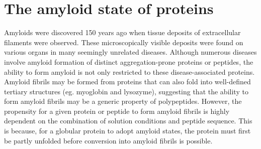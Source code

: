 


\section{The amyloid state of proteins}
\label{sec:amyloid}

Amyloids were discovered 150 years ago when tissue deposits of extracellular filaments were observed.\cite{Haass:2007db,Sipe:2000fs} These microscopically visible deposits were found on various organs in many seemingly unrelated diseases. 
Although numerous diseases involve amyloid formation of distinct aggregation-prone proteins or peptides, the ability to form amyloid is not only restricted to these disease-associated proteins. Amyloid fibrils may be formed from proteins that can also fold into well-defined tertiary structures (eg. myoglobin and lysozyme), suggesting that the ability to form amyloid fibrils may be a generic property of polypeptides.\cite{Chiti:2006fz} However, the propensity for a given protein or peptide to form amyloid fibrils is highly dependent on the combination of solution conditions and peptide sequence. This is because, for a globular protein to adopt amyloid states, the protein must first be partly unfolded before conversion into amyloid fibrils is possible.\cite{Chiti:2006fz} 

